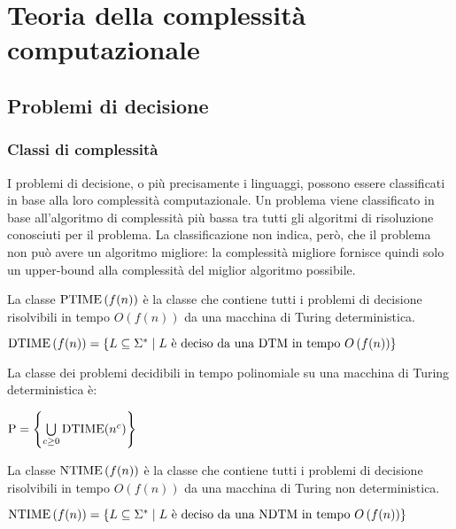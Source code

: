 \chapter{Teoria della complessità computazionale}
\section{Problemi di decisione}
\subsection*{Classi di complessità}
I problemi di decisione, o più precisamente i linguaggi, possono essere classificati in base alla loro complessità computazionale. Un problema viene classificato in base all'algoritmo di complessità più bassa tra tutti gli algoritmi di risoluzione conosciuti per il problema.
La classificazione non indica, però, che il problema non può avere un algoritmo migliore: la complessità migliore fornisce quindi solo un upper-bound alla complessità del miglior algoritmo possibile.

\begin{thm}
    La classe $\textnormal{PTIME} \left( f(n) \right)$ è la classe che contiene tutti i problemi di decisione risolvibili in tempo $O(f(n))$ da una macchina di Turing deterministica.
    \begin{center}
        $\textnormal{DTIME} \left( f(n) \right) = \left\{ L \subseteq \Sigma^* \; | \; L \textnormal{ è deciso da una DTM in tempo } O \left( f(n) \right) \right\}$
    \end{center}
\end{thm}

\begin{rem}
    La classe dei problemi decidibili in tempo polinomiale su una macchina di Turing deterministica è:
    \begin{center}
        $\textnormal{P} = \left\{ \bigcup\limits_{c \ge 0} \textnormal{DTIME}(n^c) \right\}$
    \end{center}
\end{rem}

\begin{thm}
    La classe $\textnormal{NTIME} \left( f(n) \right)$ è la classe che contiene tutti i problemi di decisione risolvibili in tempo $O(f(n))$ da una macchina di Turing non deterministica.
    \begin{center}
        $\textnormal{NTIME} \left( f(n) \right) = \left\{ L \subseteq \Sigma^* \; | \; L \textnormal{ è deciso da una NDTM in tempo } O \left( f(n) \right) \right\}$
    \end{center}
\end{thm}

